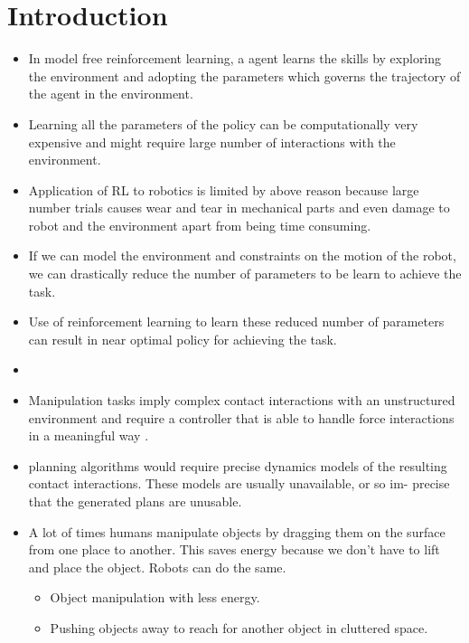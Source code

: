\documentclass[thesis]{mas_proposal}
\begin{document}
\chapter{Introduction}
\begin{itemize}
	\item In model free reinforcement learning, a agent learns the skills by exploring the environment and adopting the parameters which governs the trajectory of the agent in the environment.
	\item Learning all the parameters of the policy can be computationally very expensive and might require large number of interactions with the environment.
	\item Application of RL to robotics is limited by above reason because large number trials causes wear and tear in mechanical parts and even damage to robot and the environment apart from being time consuming. 
	\item If we can model the environment and constraints on the motion of the robot, we can drastically reduce the number of parameters to be learn to achieve the task.
	\item Use of reinforcement learning to learn these reduced number of parameters can result in near optimal policy for achieving the task.
	\item 
\end{itemize}
\begin{itemize}
    \item Manipulation tasks imply complex contact interactions with an unstructured environment and require a controller that is able to handle force interactions in a meaningful way \cite{kalakrishnan2011learning}.
    \item planning algorithms would require precise dynamics models of the resulting contact interactions. These models are usually unavailable, or so im- precise that the generated plans are unusable\cite{kalakrishnan2011learning}.
    \item A lot of times humans manipulate objects by dragging them on the surface from one place to another. This saves energy because we don't have to lift and place the object. Robots can do the same. 
    \begin{itemize}
    	\item Object manipulation with less energy.
    	\item Pushing objects away to reach for another object in cluttered space.
    \end{itemize}
\end{itemize}
\end{document}

